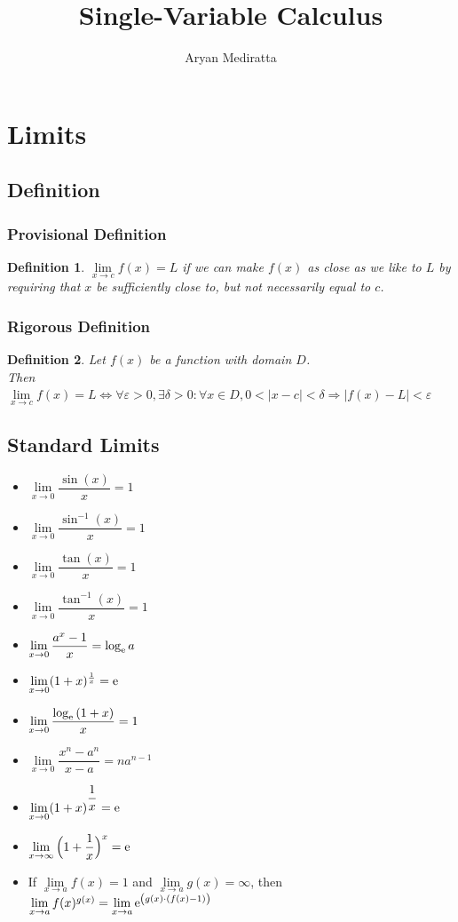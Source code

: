 \documentclass[14]{article}
\newtheorem{define}{Definition}
\theoremstyle{definition}
\begin{document}
\title{Single-Variable Calculus}
\author{Aryan Mediratta}
\maketitle
\tableofcontents
\pagebreak
\section{Limits}
\subsection{Definition}
\subsubsection{Provisional Definition}
\begin{define}
$\lim\limits_{x \to c} f(x) = L$ if we can make $f(x)$ as close as we like to $L$ by requiring that $x$ be sufficiently close to, but not necessarily equal to $c$.
\end{define}
\subsubsection{Rigorous Definition}
\begin{define}
Let $f(x)$ be a function with domain $D$.\\
Then $\lim\limits_{x \to c} f(x) = L \Leftrightarrow \forall \varepsilon > 0, \exists \delta > 0:\forall x \in D, 0 < |x-c| < \delta \Rightarrow |f(x)-L| < \varepsilon$
\end{define}
\subsection{Standard Limits}
\begin{itemize}
\item $\lim\limits_{x \to 0} \dfrac{\sin(x)}{x} = 1$
\item $\lim\limits_{x \to 0} \dfrac{\sin^{-1}(x)}{x} = 1$
\item $\lim\limits_{x \to 0} \dfrac{\tan(x)}{x} = 1$
\item $\lim\limits_{x \to 0} \dfrac{\tan^{-1}(x)}{x} = 1$
\item $\lim\limits_{x \to 0} \dfrac{a^x - 1}{x} = \log_{\rm e}{a}$
\item $\lim\limits_{x \to 0} (1+x)^{\frac{1}{x}} ={\rm e}$
\item $\lim\limits_{x \to 0} \dfrac{\log_{\rm e}{(1+x)}}{x} = 1$
\item $\lim\limits_{x \to 0} \dfrac{x^n - a^n}{x-a} = na^{n-1}$
\item $\lim\limits_{x \to 0} (1+x)^{\dfrac{1}{x}} ={\rm e}$
\item $\lim\limits_{x \to \infty} \Big(1 + \dfrac{1}{x}\Big)^x ={\rm e}$
\item If $\lim\limits_{x \to a} f(x) = 1$ and $\lim\limits_{x \to a} g(x) = \infty$, then $\lim\limits_{x \to a} f(x)^{g(x)} = \lim\limits_{x \to a} {\rm e}^{\left(g(x) \cdot (f(x) - 1)\right)}$
\end{itemize}
\end{document}
